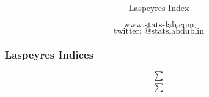 \documentclass{beamer}
\begin{document}
\begin{frame}

{
\Huge
\[\mbox{Laspeyres Index} \]
}
{
\Large

\[\mbox{www.stats-lab.com} \]
\[ \mbox{twitter: @statslabdublin} \] 

}
\end{frame}

\begin{frame}
\frametitle{Laspeyres Indices}
{
\LARGE


\[  \frac{\sum }{  \sum  }  \]


}
\end{frame}
\end{document}
